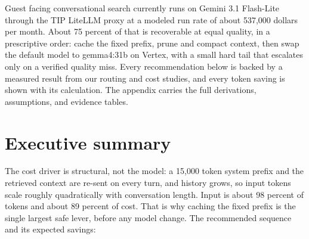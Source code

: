 \documentclass[11pt]{uce-report}
\begin{document}

\noindent Guest facing conversational search currently runs on Gemini 3.1 Flash-Lite through the TIP LiteLLM proxy at a modeled run rate of about 537,000 dollars per month. About 75 percent of that is recoverable at equal quality, in a prescriptive order: cache the fixed prefix, prune and compact context, then swap the default model to gemma4:31b on Vertex, with a small hard tail that escalates only on a verified quality miss. Every recommendation below is backed by a measured result from our routing and cost studies, and every token saving is shown with its calculation. The appendix carries the full derivations, assumptions, and evidence tables.


\vspace{0.8em}
\section{Executive summary}
The cost driver is structural, not the model: a 15,000 token system prefix and the retrieved context are re-sent on every turn, and history grows, so input tokens scale roughly quadratically with conversation length. Input is about 98 percent of tokens and about 89 percent of cost. That is why caching the fixed prefix is the single largest safe lever, before any model change. The recommended sequence and its expected savings:
\end{document}
